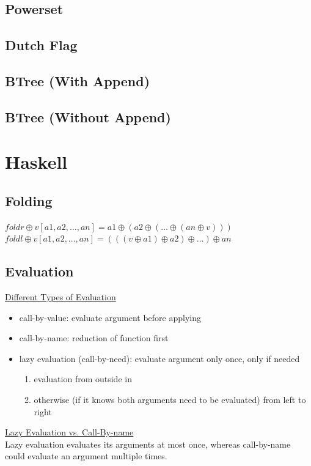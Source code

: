\documentclass[10pt,landscape,a4paper]{article}
\begin{document}
\begin{multicols*}{5}
\subsection*{Powerset}

\subsection*{Dutch Flag}

\subsection*{BTree (With Append)}

\subsection*{BTree (Without Append)}

\section{Haskell}

\subsection*{Folding}
\(foldr \oplus v [a1,a2,\ldots,an] = a1 \oplus (a2 \oplus (\ldots \oplus (an \oplus v)))\) \\
\(foldl \oplus v [a1,a2,\ldots,an] = (((v \oplus a1) \oplus a2) \oplus \ldots) \oplus an\)

\subsection*{Evaluation}
\underline{Different Types of Evaluation}
\begin{itemize}
    \item call-by-value: evaluate argument before applying
    \item call-by-name:  reduction of function first
    \item lazy evaluation (call-by-need): evaluate argument only once, only if needed
    \begin{enumerate}
        \item evaluation from outside in
        \item otherwise (if it knows both arguments need to be evaluated)
        from left to right
    \end{enumerate}
\end{itemize}
\underline{Lazy Evaluation vs. Call-By-name} \\
Lazy evaluation evaluates its arguments at most once, whereas call-by-name could evaluate an argument multiple times.


\end{multicols*}
\end{document}
